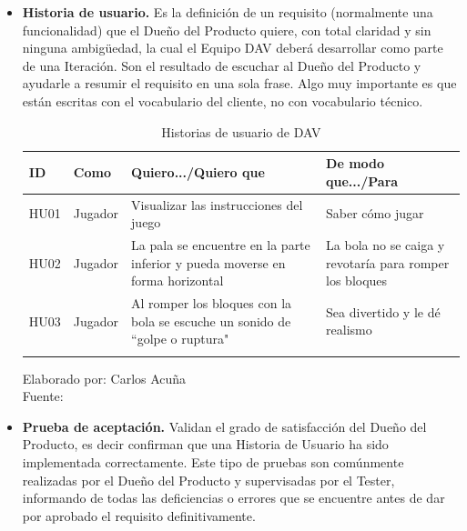 \documentclass[a4paper, openright, 12pt]{report}
\begin{document}
\begin{itemize}
\item \textbf{Historia de usuario.}
Es la definición de un requisito (normalmente una funcionalidad) que el Dueño del Producto quiere, con total claridad y sin ninguna ambigüedad, la cual el Equipo DAV deberá desarrollar como parte de una Iteración.
Son el resultado de escuchar al Dueño del Producto y ayudarle a resumir el requisito en una sola frase. Algo muy importante es que están escritas con el vocabulario del cliente, no con vocabulario técnico. \cite{Implementacion2011}

\begin{longtable}{| l | l | p{5cm} | p{5cm} |}
\captionsetup{justification=centering,margin=2cm}
\hline
\textbf{ID} & \textbf{Como} & \textbf{Quiero.../Quiero que} & \textbf{De modo que.../Para} \\ \hline
HU01 & Jugador &
Visualizar las instrucciones del juego &
Saber cómo jugar \\ \hline
HU02 & Jugador &
La pala se encuentre en la parte inferior y pueda moverse en forma horizontal  &
La bola no se caiga y revotaría para romper los bloques\\ \hline
HU03 & Jugador &
Al romper los bloques con la bola se escuche un sonido de ``golpe o ruptura" &
Sea divertido y le dé realismo \\ \hline
\caption{Historias de usuario de DAV}
\end{longtable}
\begin{center}
Elaborado por: Carlos Acuña\\Fuente: \cite{Implementacion2011}
\end{center}

\item \textbf{Prueba de aceptación.}
Validan el grado de satisfacción del Dueño del Producto, es decir confirman que una Historia de Usuario ha sido implementada correctamente. Este tipo de pruebas son comúnmente realizadas por el Dueño del Producto y supervisadas por el Tester, informando de todas las deficiencias o errores que se encuentre antes de dar por aprobado el requisito definitivamente.


\end{itemize}
\end{document}
